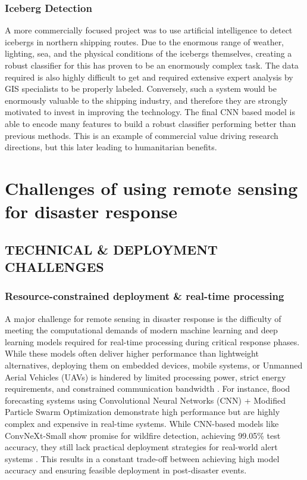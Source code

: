 \documentclass[conference,a4paper]{IEEEtran}
\begin{document}
\subsubsection{Iceberg Detection}

A more commercially focused project was to use artificial intelligence to detect icebergs in northern shipping routes.  Due to the enormous range of weather, lighting, sea,  and the physical conditions of the icebergs themselves, creating a robust classifier for this has proven to be an enormously complex task. The data required is also highly difficult to get and required extensive expert analysis by GIS specialists to be properly labeled. Conversely, such a system would be enormously valuable to the shipping industry, and therefore they are strongly motivated to invest in improving the technology. The final CNN based model is able to encode many features to build a robust classifier performing better than previous methods. This is an example of commercial value driving research directions, but this later leading to humanitarian benefits.


\section{Challenges of using remote sensing for disaster response}


\subsection{TECHNICAL \& DEPLOYMENT CHALLENGES}

\subsubsection{\textbf{Resource-constrained deployment \& real-time processing}}
A major challenge for remote sensing in disaster response is the difficulty of meeting the computational demands of modern machine learning and deep learning models required for real-time processing during critical response phases. While these models often deliver higher performance than lightweight alternatives, deploying them on embedded devices, mobile systems, or Unmanned Aerial Vehicles (UAVs) is hindered by limited processing power, strict energy requirements, and constrained communication bandwidth \cite{elbohy2025fusion}. For instance, flood forecasting systems using Convolutional Neural Networks (CNN) + Modified Particle Swarm Optimization demonstrate high performance but are highly complex and expensive in real-time systems. While CNN-based models like ConvNeXt-Small show promise for wildfire detection, achieving 99.05\% test accuracy, they still lack practical deployment strategies for real-world alert systems \cite{elbohy2025fusion}. This results in a constant trade-off between achieving high model accuracy and ensuring feasible deployment in post-disaster events.
\end{document}
